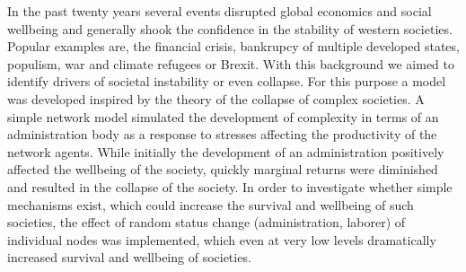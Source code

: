 In the past twenty years several events disrupted global economics and social wellbeing and generally shook the confidence in the stability of western societies. Popular examples are, the financial crisis, bankrupcy of multiple developed states, populism, war and climate refugees or Brexit. With this background we aimed to identify drivers of societal instability or even collapse. For this purpose a model was developed inspired by the theory of the collapse of complex societies. A simple network model simulated the development of complexity in terms of an administration body as a response to stresses affecting the productivity of the network agents. While initially the development of an administration positively affected the wellbeing of the society, quickly marginal returns were diminished and resulted in the collapse of the society. In order to investigate whether simple mechanisms exist, which could increase the survival and wellbeing of such societies, the effect of random status change (administration, laborer) of individual nodes was implemented, which even at very low levels dramatically increased survival and wellbeing of societies.


